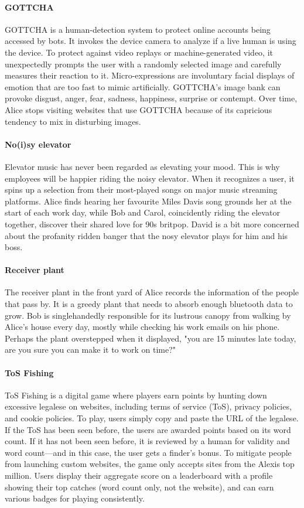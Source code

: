 \paragraph{GOTTCHA}
GOTTCHA is a human-detection system to protect online accounts being accessed by bots. It invokes the device camera to analyze if a live human is using the device. To protect against video replays or machine-generated video, it unexpectedly prompts the user with a randomly selected image and carefully measures their reaction to it. Micro-expressions are involuntary facial displays of emotion that are too fast to mimic artificially. GOTTCHA's image bank can provoke disgust, anger, fear, sadness, happiness, surprise or contempt. Over time, Alice stops visiting websites that use GOTTCHA because of its capricious tendency to mix in disturbing images.

\paragraph{No(i)sy elevator}
Elevator music has never been regarded as elevating your mood. This is why employees will be happier riding the noisy elevator. When it recognizes a user, it spins up a selection from their most-played songs on major music streaming platforms. Alice finds hearing her favourite Miles Davis song grounds her at the start of each work day, while Bob and Carol, coincidently riding the elevator together, discover their shared love for 90s britpop. David is a bit more concerned about the profanity ridden banger that the nosy elevator plays for him and his boss.

\paragraph{Receiver plant}
The receiver plant in the front yard of Alice records the information of the people that pass by. It is a greedy plant that needs to absorb enough bluetooth data to grow. Bob is singlehandedly responsible for its lustrous canopy from walking by Alice's house every day, mostly while checking his work emails on his phone. Perhaps the plant overstepped when it displayed, "you are 15 minutes late today, are you sure you can make it to work on time?"

\paragraph{ToS Fishing}
ToS Fishing is a digital game where players earn points by hunting down excessive legalese on websites, including terms of service (ToS), privacy policies, and cookie policies. To play, users simply copy and paste the URL of the legalese. If the ToS has been seen before, the users are awarded points based on its word count. If it has not been seen before, it is reviewed by a human for validity and word count—and in this case, the user gets a finder's bonus. To mitigate people from launching custom websites, the game only accepts sites from the Alexis top million. Users display their aggregate score on a leaderboard with a profile showing their top catches (word count only, not the website), and can earn various badges for playing consistently.

